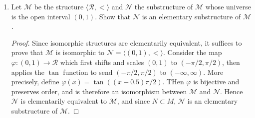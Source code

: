 \documentclass{article}
\begin{document}
\begin{enumerate}
\begin{enumerate}
      \item Let $\mathcal{M}$ be the structure
        $\langle\mathcal{R},<\rangle$ and $\mathcal{N}$ the substructure of
        $\mathcal{M}$ whose universe is the open interval $(0,1)$. Show
        that $\mathcal{N}$ is an elementary substructure of $\mathcal{M}$.

        \begin{proof}
          Since isomorphic structures are elementarily equivalent, it
          suffices to prove that $\mathcal{M}$ is isomorphic to
          $\mathcal{N}=\langle(0,1),<\rangle$. Consider the map
          $\varphi:(0,1)\rightarrow\mathcal{R}$ which first
          shifts and scales $(0,1)$ to $(-\pi/2,\pi/2)$, then applies the
          $\tan$ function to send $(-\pi/2,\pi/2)$ to $(-\infty,\infty)$.
          More precisely, define $\varphi(x)=\tan((x-0.5)\pi/2)$. THen
          $\varphi$ is bijective and preserves order, and is therefore an
          isomorphism between $\mathcal{M}$ and $\mathcal{N}$. Hence
          $\mathcal{N}$ is elementarily equivalent to $\mathcal{M}$, and
          since $N\subset M$, $\mathcal{N}$ is an elementary substructure
          of $\mathcal{M}$.
        \end{proof}
    \end{enumerate}
\end{enumerate}
\end{document}
